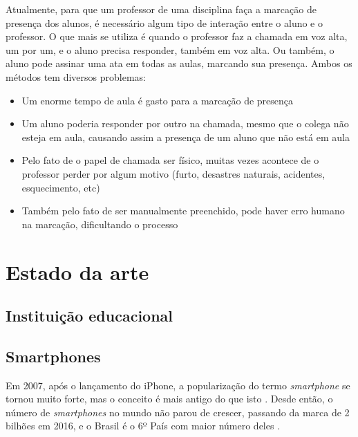\documentclass[
	12pt,
	oneside,
	a4paper,
	english,
	brazil,
]{abntex2}
\begin{document}
Atualmente, para que um professor de uma disciplina faça a marcação de presença dos alunos, é necessário algum tipo de interação entre o aluno e o professor. O que mais se utiliza é quando o professor faz a chamada em voz alta, um por um, e o aluno precisa responder, também em voz alta. Ou também, o aluno pode assinar uma ata em todas as aulas, marcando sua presença. Ambos os métodos tem diversos problemas:

\begin{itemize}
    \item Um enorme tempo de aula é gasto para a marcação de presença
    \item Um aluno poderia responder por outro na chamada, mesmo que o colega não esteja em aula, causando assim a presença de um aluno que não está em aula
    \item Pelo fato de o papel de chamada ser físico, muitas vezes acontece de o professor perder por algum motivo (furto, desastres naturais, acidentes, esquecimento, etc)
    \item Também pelo fato de ser manualmente preenchido, pode haver erro humano na marcação, dificultando o processo
\end{itemize}



\chapter{Estado da arte}

\section{Instituição educacional}


\section{Smartphones}

Em 2007, após o lançamento do iPhone, a popularização do termo \emph{smartphone} se tornou muito forte, mas o conceito é mais antigo do que isto \cite{smartphone-history-pictures}. Desde então, o número de \emph{smartphones} no mundo não parou de crescer, passando da marca de 2 bilhões em 2016, e o Brasil é o 6º País com maior número deles \cite{smartphone-numbers}.
\end{document}
